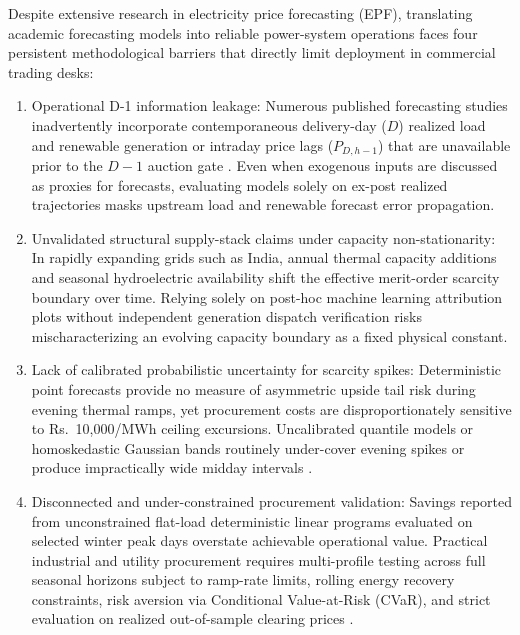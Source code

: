 \documentclass[runningheads,a4paper]{llncs}
\begin{document}
Despite extensive research in electricity price forecasting (EPF), translating academic forecasting models into reliable power-system operations faces four persistent methodological barriers that directly limit deployment in commercial trading desks:
\begin{enumerate}
    \item Operational D-1 information leakage: Numerous published forecasting studies inadvertently incorporate contemporaneous delivery-day ($D$) realized load and renewable generation or intraday price lags ($P_{D,h-1}$) that are unavailable prior to the $D-1$ auction gate \cite{lago2021forecasting}. Even when exogenous inputs are discussed as proxies for forecasts, evaluating models solely on ex-post realized trajectories masks upstream load and renewable forecast error propagation.
    \item Unvalidated structural supply-stack claims under capacity non-stationarity: In rapidly expanding grids such as India, annual thermal capacity additions and seasonal hydroelectric availability shift the effective merit-order scarcity boundary over time. Relying solely on post-hoc machine learning attribution plots without independent generation dispatch verification risks mischaracterizing an evolving capacity boundary as a fixed physical constant.
    \item Lack of calibrated probabilistic uncertainty for scarcity spikes: Deterministic point forecasts provide no measure of asymmetric upside tail risk during evening thermal ramps, yet procurement costs are disproportionately sensitive to Rs.~10,000/MWh ceiling excursions. Uncalibrated quantile models or homoskedastic Gaussian bands routinely under-cover evening spikes or produce impractically wide midday intervals \cite{nowotarski2018recent,romano2019conformalized}.
    \item Disconnected and under-constrained procurement validation: Savings reported from unconstrained flat-load deterministic linear programs evaluated on selected winter peak days overstate achievable operational value. Practical industrial and utility procurement requires multi-profile testing across full seasonal horizons subject to ramp-rate limits, rolling energy recovery constraints, risk aversion via Conditional Value-at-Risk (CVaR), and strict evaluation on realized out-of-sample clearing prices \cite{conejo2010decision,rockafellar2000optimization}.
\end{enumerate}
\end{document}
